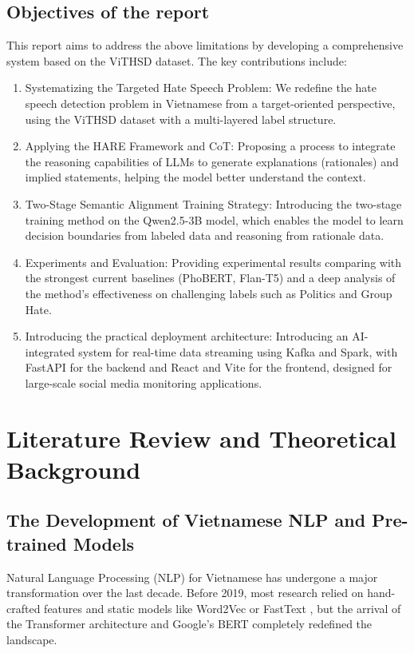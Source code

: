 \documentclass[11pt]{article}
\begin{document}
\subsection{Objectives of the report}
This report aims to address the above limitations by developing a comprehensive system
based on the ViTHSD dataset. The key contributions include:
\begin{enumerate}[leftmargin=*]
\item Systematizing the Targeted Hate Speech Problem: We redefine the hate speech
detection problem in Vietnamese from a target-oriented perspective, using the ViTHSD
dataset with a multi-layered label structure.
\item Applying the HARE Framework and CoT: Proposing a process to integrate the
reasoning capabilities of LLMs to generate explanations (rationales) and implied
statements, helping the model better understand the context.
\item Two-Stage Semantic Alignment Training Strategy: Introducing the two-stage
training method on the Qwen2.5-3B model, which enables the model to learn decision
boundaries from labeled data and reasoning from rationale data.
\item Experiments and Evaluation: Providing experimental results comparing with the
strongest current baselines (PhoBERT, Flan-T5) and a deep analysis of the method's
effectiveness on challenging labels such as Politics and Group Hate.
\item Introducing the practical deployment architecture: Introducing an AI-integrated
system for real-time data streaming using Kafka and Spark, with FastAPI for the
backend and React and Vite for the frontend, designed for large-scale social media
monitoring applications.
\end{enumerate}

\section{Literature Review and Theoretical Background}

\subsection{The Development of Vietnamese NLP and Pre-trained Models}
Natural Language Processing (NLP) for Vietnamese has undergone a major transformation
over the last decade. Before 2019, most research relied on hand-crafted features and static
models like Word2Vec \citep{mikolov2013efficient} or FastText \citep{bojanowski2017enriching}, but the arrival of the Transformer architecture \citep{vaswani2017attention} and
Google's BERT \citep{devlin2019bert} completely redefined the landscape.
\end{document}
